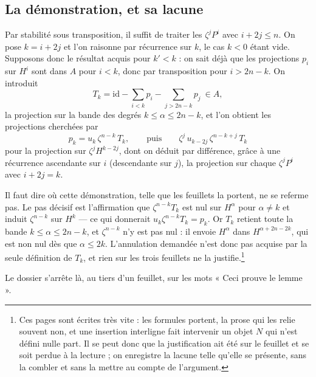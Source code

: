 \documentclass[11pt,a4paper]{article}
\begin{document}
\subsection*{La démonstration, et sa lacune}

Par stabilité sous transposition, il suffit de traiter les $\zeta^{j}P^{i}$
avec $i + 2j \leqslant n$. On pose $k = i + 2j$ et l'on raisonne par récurrence
sur $k$, le cas $k < 0$ étant vide. Supposons donc le résultat acquis pour
$k' < k$ : on sait déjà que les projections $p_{i}$ sur $H^{i}$ sont dans $A$
pour $i < k$, donc par transposition pour $i > 2n-k$. On introduit
\[
T_{k} = \mathrm{id} - \sum_{i < k} p_{i} - \sum_{j > 2n-k} p_{j} \ \in A,
\]
la projection sur la bande des degrés $k \leqslant \alpha \leqslant 2n-k$, et
l'on obtient les projections cherchées par
\[
p_{k} = u_{k}\,\zeta^{n-k}\,T_{k},
\qquad
\text{puis} \qquad
\zeta^{j}\,u_{k-2j}\,\zeta^{n-k+j}\,T_{k}
\]
pour la projection sur $\zeta^{j}H^{k-2j}$, dont on déduit par différence,
grâce à une récurrence ascendante sur $i$ (descendante sur $j$), la projection
sur chaque $\zeta^{j}P^{i}$ avec $i + 2j = k$.

Il faut dire où cette démonstration, telle que les feuillets la portent, ne se
referme pas. Le pas décisif est l'affirmation que $\zeta^{n-k}T_{k}$ est nul
sur $H^{\alpha}$ pour $\alpha \neq k$ et induit $\zeta^{n-k}$ sur $H^{k}$ ---
ce qui donnerait $u_{k}\zeta^{n-k}T_{k} = p_{k}$. Or $T_{k}$ retient toute la
bande $k \leqslant \alpha \leqslant 2n-k$, et $\zeta^{n-k}$ n'y est pas nul :
il envoie $H^{\alpha}$ dans $H^{\alpha+2n-2k}$, qui est non nul dès que
$\alpha \leqslant 2k$. L'annulation demandée n'est donc pas acquise par la
seule définition de $T_{k}$, et rien sur les trois feuillets ne la
justifie.\footnote{Ces pages sont écrites très vite : les formules portent, la
prose qui les relie souvent non, et une insertion interligne fait intervenir un
objet $N$ qui n'est défini nulle part. Il se peut donc que la justification ait
été sur le feuillet et se soit perdue à la lecture ; on enregistre la lacune
telle qu'elle se présente, sans la combler et sans la mettre au compte de
l'argument.}

Le dossier s'arrête là, au tiers d'un feuillet, sur les mots « Ceci prouve le
lemme ».
\end{document}
